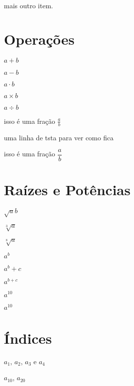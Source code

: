 \documentclass[a4paper, 12pt]{article}
\begin{document}
    \item mais outro item.


\section{Operações}
$a + b$

$a - b$

$a\cdot b$

$a \times b$

$a \div b$

isso é uma fração $\frac{a}{b}$

uma linha de tsta para ver como fica

isso é uma fração $\dfrac{a}{b}$

\section{Raízes e Potências}

$\sqrt{a}{b}$

$\sqrt[3]{a}$

$\sqrt[8]{a}$

$a^b$

$a^b+c$

$a^{b+c}$

$a^10$

$a^{10}$

\section{Índices}

$a_1$, $a_2$, $a_3$ e $a_4$

$a_{10}$, $a_{20}$
\end{document}
